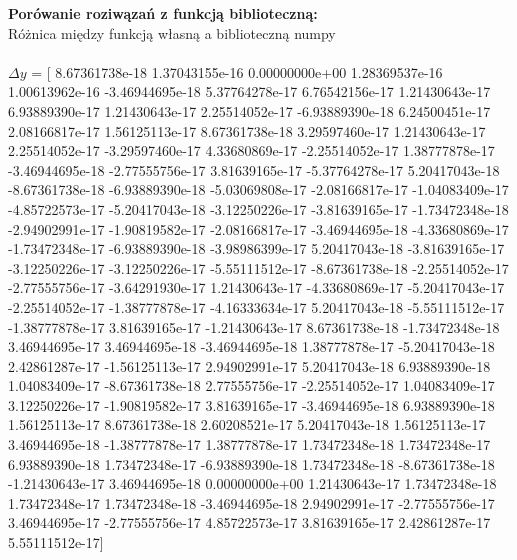\documentclass[a4paper,12pt]{article}
\begin{document}
\Large\textbf {{Porówanie roziwązań z funkcją biblioteczną:}}
\\
\large {Różnica między funkcją własną a biblioteczną numpy}
\\
\\

\normalsize 
$\Delta y$ = [ 8.67361738e-18  1.37043155e-16  0.00000000e+00  1.28369537e-16
  1.00613962e-16 -3.46944695e-18  5.37764278e-17  6.76542156e-17
  1.21430643e-17  6.93889390e-17  1.21430643e-17  2.25514052e-17
 -6.93889390e-18  6.24500451e-17  2.08166817e-17  1.56125113e-17
  8.67361738e-18  3.29597460e-17  1.21430643e-17  2.25514052e-17
 -3.29597460e-17  4.33680869e-17 -2.25514052e-17  1.38777878e-17
 -3.46944695e-18 -2.77555756e-17  3.81639165e-17 -5.37764278e-17
  5.20417043e-18 -8.67361738e-18 -6.93889390e-18 -5.03069808e-17
 -2.08166817e-17 -1.04083409e-17 -4.85722573e-17 -5.20417043e-18
 -3.12250226e-17 -3.81639165e-17 -1.73472348e-18 -2.94902991e-17
 -1.90819582e-17 -2.08166817e-17 -3.46944695e-18 -4.33680869e-17
 -1.73472348e-17 -6.93889390e-18 -3.98986399e-17  5.20417043e-18
 -3.81639165e-17 -3.12250226e-17 -3.12250226e-17 -5.55111512e-17
 -8.67361738e-18 -2.25514052e-17 -2.77555756e-17 -3.64291930e-17
  1.21430643e-17 -4.33680869e-17 -5.20417043e-17 -2.25514052e-17
 -1.38777878e-17 -4.16333634e-17  5.20417043e-18 -5.55111512e-17
 -1.38777878e-17  3.81639165e-17 -1.21430643e-17  8.67361738e-18
 -1.73472348e-18  3.46944695e-17  3.46944695e-18 -3.46944695e-18
  1.38777878e-17 -5.20417043e-18  2.42861287e-17 -1.56125113e-17
  2.94902991e-17  5.20417043e-18  6.93889390e-18  1.04083409e-17
 -8.67361738e-18  2.77555756e-17 -2.25514052e-17  1.04083409e-17
  3.12250226e-17 -1.90819582e-17  3.81639165e-17 -3.46944695e-18
  6.93889390e-18  1.56125113e-17  8.67361738e-18  2.60208521e-17
  5.20417043e-18  1.56125113e-17  3.46944695e-18 -1.38777878e-17
  1.38777878e-17  1.73472348e-18  1.73472348e-17  6.93889390e-18
  1.73472348e-17 -6.93889390e-18  1.73472348e-18 -8.67361738e-18
 -1.21430643e-17  3.46944695e-18  0.00000000e+00  1.21430643e-17
  1.73472348e-18  1.73472348e-17  1.73472348e-18 -3.46944695e-18
  2.94902991e-17 -2.77555756e-17  3.46944695e-17 -2.77555756e-17
  4.85722573e-17  3.81639165e-17  2.42861287e-17  5.55111512e-17]
\\
\\
\\
\\
\\
\\
\\
\\
\\
\\
\\\\\\
\\
\end{document}
